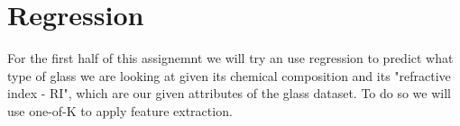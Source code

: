 \section{Regression}
For the first half of this assignemnt we will try an use regression to predict what type of glass we are looking at given its chemical composition and its "refractive index - RI", which are our given attributes of the glass dataset. To do so we will use one-of-K to apply feature extraction.